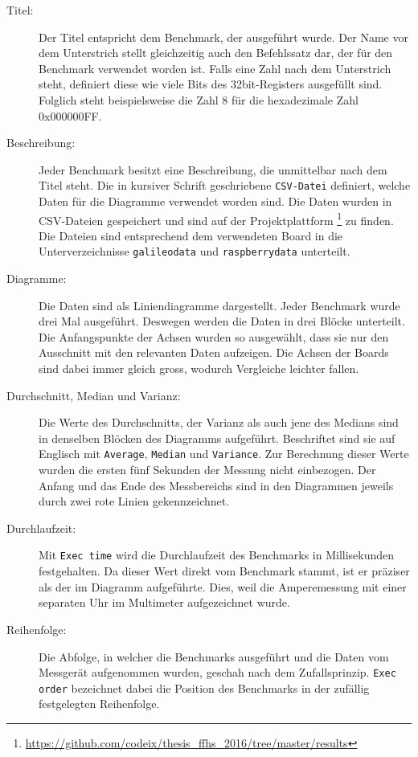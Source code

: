 \begin{description}
\item[Titel:]
Der Titel entspricht dem Benchmark, der ausgeführt wurde. Der Name vor dem Unterstrich stellt gleichzeitig auch den Befehlssatz dar, der für den Benchmark verwendet worden ist. Falls eine Zahl nach dem Unterstrich steht, definiert diese wie viele Bits des 32bit-Registers ausgefüllt sind. Folglich steht beispielsweise die Zahl 8 für die hexadezimale Zahl 0x000000FF.
\item[Beschreibung:]
Jeder Benchmark besitzt eine Beschreibung, die unmittelbar nach dem Titel steht. Die in kursiver Schrift geschriebene \texttt{CSV-Datei} definiert, welche Daten für die Diagramme verwendet worden sind. Die Daten wurden in CSV-Dateien gespeichert und sind auf der Projektplattform \footnote{\url{https://github.com/codeix/thesis_ffhs_2016/tree/master/results}} zu finden. Die Dateien sind entsprechend dem verwendeten Board in die Unterverzeichnisse \texttt{galileodata} und \texttt{raspberrydata} unterteilt. 
\item[Diagramme:]
Die Daten sind als Liniendiagramme dargestellt. Jeder Benchmark wurde drei Mal ausgeführt. Deswegen werden die Daten in drei Blöcke unterteilt. Die Anfangspunkte der Achsen wurden so ausgewählt, dass sie nur den Ausschnitt mit den relevanten Daten aufzeigen. Die Achsen der Boards sind dabei immer gleich gross, wodurch Vergleiche leichter fallen.
\item[Durchschnitt, Median und Varianz:]
Die Werte des Durchschnitts, der Varianz als auch jene des Medians sind in denselben Blöcken des Diagramms aufgeführt. Beschriftet sind sie auf Englisch mit \texttt{Average}, \texttt{Median} und \texttt{Variance}. Zur Berechnung dieser Werte wurden die ersten fünf Sekunden der Messung nicht einbezogen. Der Anfang und das Ende des Messbereichs sind in den Diagrammen jeweils durch zwei rote Linien gekennzeichnet.
\item[Durchlaufzeit:]
Mit \texttt{Exec time} wird die Durchlaufzeit des Benchmarks in Millisekunden festgehalten. Da dieser Wert direkt vom Benchmark stammt, ist er präziser als der im Diagramm aufgeführte. Dies, weil die Amperemessung mit einer separaten Uhr im Multimeter aufgezeichnet wurde.
\item[Reihenfolge:] Die Abfolge, in welcher die Benchmarks ausgeführt und die Daten vom Messgerät aufgenommen wurden, geschah nach dem Zufallsprinzip. \texttt{Exec order} bezeichnet dabei die Position des Benchmarks in der zufällig festgelegten Reihenfolge.

\end{description}

